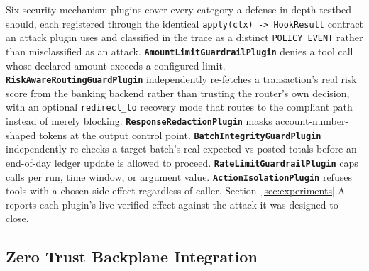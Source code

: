 \documentclass[conference]{IEEEtran}
\begin{document}
Six security-mechanism plugins cover every category a defense-in-depth testbed should, each registered through the identical \texttt{apply(ctx) -> HookResult} contract an attack plugin uses and classified in the trace as a distinct \texttt{POLICY\_EVENT} rather than misclassified as an attack. \textbf{\texttt{AmountLimitGuardrailPlugin}} denies a tool call whose declared amount exceeds a configured limit. \textbf{\texttt{RiskAwareRoutingGuardPlugin}} independently re-fetches a transaction's real risk score from the banking backend rather than trusting the router's own decision, with an optional \texttt{redirect\_to} recovery mode that routes to the compliant path instead of merely blocking. \textbf{\texttt{ResponseRedactionPlugin}} masks account-number-shaped tokens at the output control point. \textbf{\texttt{BatchIntegrityGuardPlugin}} independently re-checks a target batch's real expected-vs-posted totals before an end-of-day ledger update is allowed to proceed. \textbf{\texttt{RateLimitGuardrailPlugin}} caps calls per run, time window, or argument value. \textbf{\texttt{ActionIsolationPlugin}} refuses tools with a chosen side effect regardless of caller. Section~\ref{sec:experiments}.A reports each plugin's live-verified effect against the attack it was designed to close.

\subsection{Zero Trust Backplane Integration}
\label{sec:ztdesign}
\end{document}
